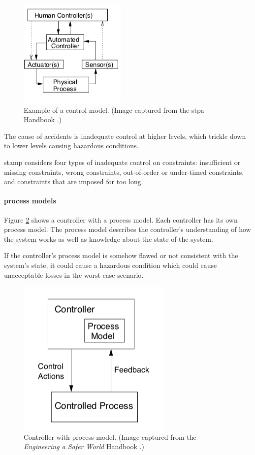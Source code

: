 \documentclass[../../main/main.tex]{subfiles}
\begin{document}
\begin{figure}[h!]
\centering
\includegraphics[width=0.5\linewidth]{../figures/controlmodel}
\caption{\label{controlmodel} Example of a control model. (Image captured from the \gls{stpa} Handbook \cite{stpa}.)}
\end{figure}
The cause of accidents is inadequate control at higher levels, which trickle down to lower levels causing hazardous conditions.  

\gls{stamp} considers four types of inadequate control on constraints: insufficient or missing constraints, wrong constraints, out-of-order or under-timed constraints, and constraints that are imposed for too long. 

\paragraph*{process models}
Figure \ref{processmodel} shows a controller with a process model.  Each controller has its own process model.  The process model describes the controller's understanding of how the system works as well as knowledge about the state of the system.  

If the controller's process model is somehow flawed or not consistent with the system's state, it could cause a hazardous condition which could cause unacceptable losses in the worst-case scenario.

\begin{figure}[h!]
\centering
\includegraphics[width=0.5\linewidth]{../figures/processmodel}
\caption{\label{processmodel} Controller with process model. (Image captured from the \textit{Engineering a Safer World} Handbook \cite{saferworld}.)}
\end{figure}
\end{document}
